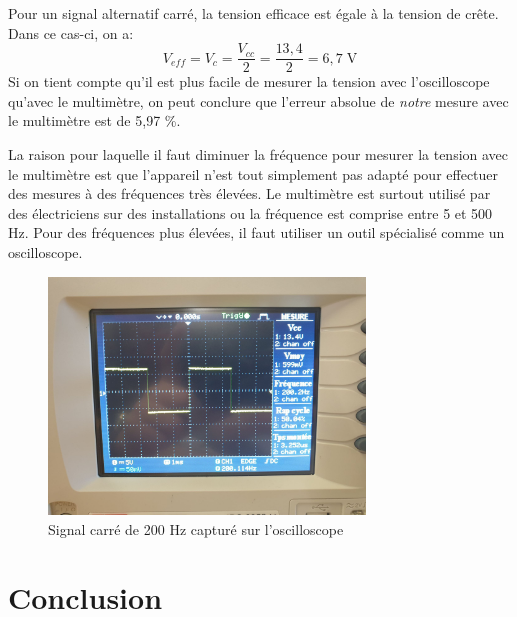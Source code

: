 \documentclass[a4paper]{article}
\begin{document}
\begin{enumerate}
  Pour un signal alternatif carré, la tension efficace est égale à la tension de crête. Dans ce cas-ci, on a:
  \[ V_{eff} = V_c = \frac{V_{cc}}{2} = \frac{13,4}{2} = 6,7 \; \text{V} \]
  Si on tient compte qu'il est plus facile de mesurer la tension avec l'oscilloscope qu'avec le multimètre, on peut conclure que l'erreur absolue de \textit{notre} mesure avec le multimètre est de 5,97 \%.

  La raison pour laquelle il faut diminuer la fréquence pour mesurer la tension avec le multimètre est que l'appareil n'est tout simplement pas adapté pour effectuer des mesures à des fréquences très élevées. Le multimètre est surtout utilisé par des électriciens sur des installations ou la fréquence est comprise entre 5 et 500 Hz. Pour des fréquences plus élevées, il faut utiliser un outil spécialisé comme un oscilloscope.

\begin{figure}%
  \centering
  \includegraphics[width=0.75\textwidth]{signal-carre01.jpg}  
  \caption{Signal carré de 200 Hz capturé sur l'oscilloscope}
  \label{fig:signalCarre1}
\end{figure}





\end{enumerate}














\section{Conclusion}
\end{document}
